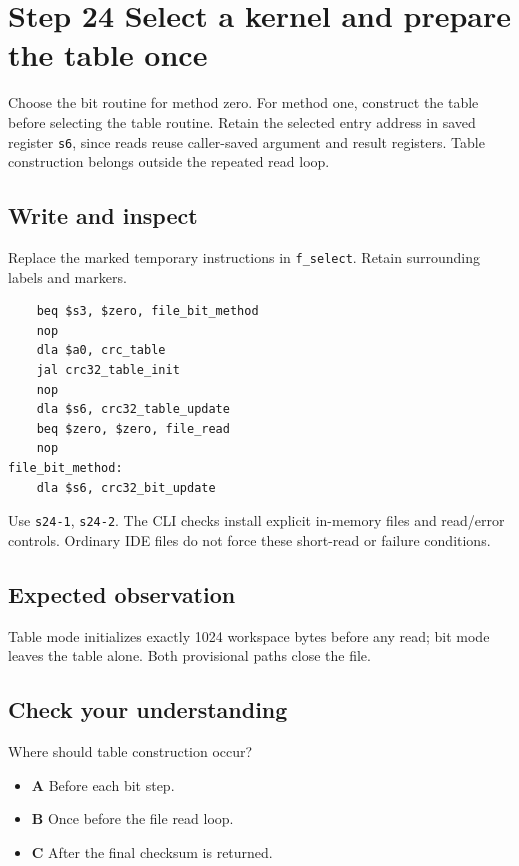 \section{Step 24 Select a kernel and prepare the table once}\label{crc-s24}

Choose the bit routine for method zero. For method one, construct the table before selecting the table routine. Retain the selected entry address in saved register \texttt{s6}, since reads reuse caller-saved argument and result registers. Table construction belongs outside the repeated read loop.

\subsection{Write and inspect}
Replace the marked temporary instructions in \texttt{f\_select}. Retain surrounding labels and markers.

\begin{verbatim}
    beq $s3, $zero, file_bit_method
    nop
    dla $a0, crc_table
    jal crc32_table_init
    nop
    dla $s6, crc32_table_update
    beq $zero, $zero, file_read
    nop
file_bit_method:
    dla $s6, crc32_bit_update
\end{verbatim}

Use \texttt{s24-1}, \texttt{s24-2}. The CLI checks install explicit in-memory files and read/error controls. Ordinary IDE files do not force these short-read or failure conditions.

\subsection{Expected observation}
Table mode initializes exactly 1024 workspace bytes before any read; bit mode leaves the table alone. Both provisional paths close the file.

\subsection{Check your understanding}
Where should table construction occur?

\begin{itemize}
  \item \textbf{A} Before each bit step.
  \item \textbf{B} Once before the file read loop.
  \item \textbf{C} After the final checksum is returned.
\end{itemize}
